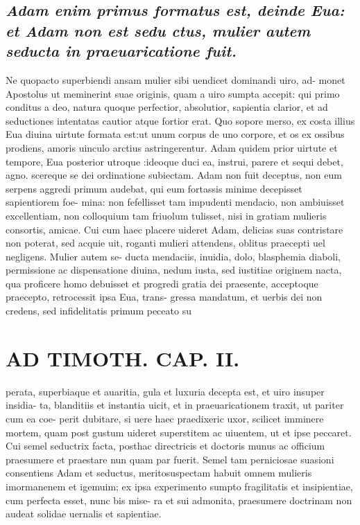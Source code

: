 \documentclass{article}
\begin{document}
\begin{pages}
\subsection*{\textit{Adam enim primus formatus est, deinde Eua: et Adam non est sedu ctus, mulier autem seducta in praeuaricatione fuit. }}\pstart Ne quopacto superbiendi ansam mulier sibi uendicet dominandi uiro, ad- monet Apostolus ut meminerint suae originis, quam a uiro sumpta accepit: qui primo conditus a deo, natura quoque perfectior, absolutior, sapientia clarior, et ad seductiones intentatas cautior atque fortior erat. Quo sopore merso, ex costa illius Eua diuina uirtute formata est:ut unum corpus de uno corpore, et os ex ossibus prodiens, amoris uinculo arctius astringerentur. Adam quidem prior uirtute et tempore, Eua posterior utroque :ideoque duci ea, instrui, parere et sequi debet, agno. scereque se dei ordinatione subiectam. Adam non fuit deceptus, non eum serpens aggredi primum audebat, qui eum fortassis minime decepisset sapientiorem foe- mina: non fefellisset tam impudenti mendacio, non ambiuisset excellentiam, non colloquium tam friuolum tulisset, nisi in gratiam mulieris consortis, amicae. Cui cum haec placere uideret Adam, delicias suas contristare non poterat, sed acquie uit, roganti mulieri attendens, oblitus praecepti uel negligens. Mulier autem se- ducta mendaciis, inuidia, dolo, blasphemia diaboli, permissione ac dispensatione diuina, nedum iusta, sed iustitiae originem nacta, qua proficere homo debuisset et progredi gratia dei praesente, acceptoque praecepto, retrocessit ipsa Eua, trans- gressa mandatum, et uerbis dei non credens, sed infidelitatis primum peceato su  \pend
\section*{AD TIMOTH. CAP. II. }
\marginpar{[ p.489 ]}\pstart perata, superbiaque et auaritia, gula et luxuria decepta est, et uiro insuper insidia- ta, blanditiis et instantia uicit, et in praeuaricationem traxit, ut pariter cum ea coe- perit dubitare, si uere haec praedixeric uxor, scilicet imminere mortem, quam post gustum uideret superstitem ac uiuentem, ut et ipse peccaret. Cui semel seductrix facta, posthac directricis et doctoris munus ac officium praesumere et praestare nun quam par fuerit. Semel tam perniciosae suasioni consentiens Adam et seductus, meritosuspectam habuit omnem mulieris imormanenem et igemuim; ex ipsa experimento sumpto fragilitatis et insipientiae, cum perfecta esset, nunc bis mise- ra et sui admonita, praesumere doctrinam non audeat solidae uernalis et sapientiae.  \pend
{}
{}

\end{pages}
\end{document}
